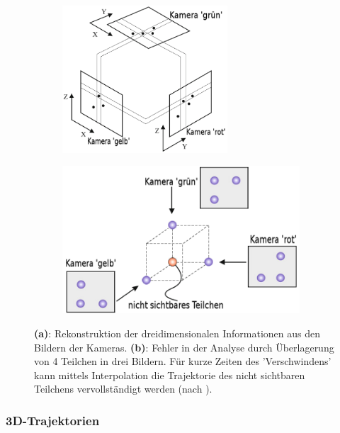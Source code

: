 \documentclass[numbers=noenddot,a4paper]{scrartcl}
\newcommand{\fett}[1]{\textbf{#1}}
\begin{document}
                \begin{figure}
                    \begin{subfigure}[b]{0.4\textwidth}
                        \centering
                        \includegraphics[width=\textwidth,height=5.5cm]{figs/rekonstruktion.png}
                        \caption{}
                    \end{subfigure}
                    \begin{subfigure}[b]{0.56\textwidth}
                        \centering
                        \includegraphics[width=\textwidth,height=5.5cm]{figs/nichtsichtbar.png}
                        \caption{}
                    \end{subfigure}
                    \caption{\fett{(a)}: Rekonstruktion der dreidimensionalen Informationen aus den Bildern der Kameras. \fett{(b)}: Fehler in der Analyse durch Überlagerung von 4 Teilchen in drei Bildern. Für kurze Zeiten des 'Verschwindens' kann mittels Interpolation die Trajektorie des nicht sichtbaren Teilchens vervollständigt werden (nach \cite{Bonitz10}).}
                    \label{img:rekonstruktion}
                \end{figure}

				\subsubsection{3D-Trajektorien}
\end{document}
